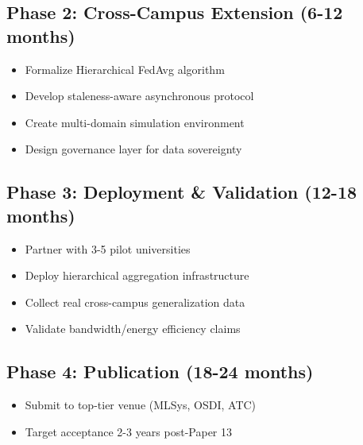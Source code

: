 \documentclass[conference]{IEEEtran}
\begin{document}
\subsection{Phase 2: Cross-Campus Extension (6-12 months)}
\begin{itemize}
    \item Formalize Hierarchical FedAvg algorithm
    \item Develop staleness-aware asynchronous protocol
    \item Create multi-domain simulation environment
    \item Design governance layer for data sovereignty
\end{itemize}

\subsection{Phase 3: Deployment \& Validation (12-18 months)}
\begin{itemize}
    \item Partner with 3-5 pilot universities
    \item Deploy hierarchical aggregation infrastructure
    \item Collect real cross-campus generalization data
    \item Validate bandwidth/energy efficiency claims
\end{itemize}

\subsection{Phase 4: Publication (18-24 months)}
\begin{itemize}
    \item Submit to top-tier venue (MLSys, OSDI, ATC)
    \item Target acceptance 2-3 years post-Paper 13
\end{itemize}
\end{document}

